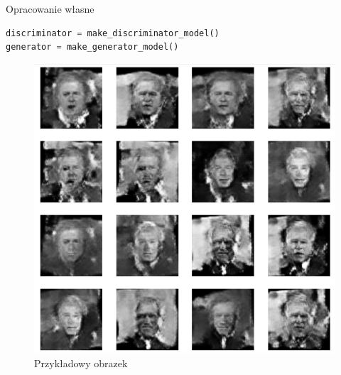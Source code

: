\documentclass[wi]{zut}
\begin{document}
{Opracowanie własne}{\label{kod:przyklad}}
\begin{lstlisting}[language=Python]
discriminator = make_discriminator_model()
generator = make_generator_model()
\end{lstlisting}

\begin{figure}[H]
    \centering
    \includegraphics[width=0.7\linewidth]{images/sample.png}
    \caption{Przykładowy obrazek}
    \label{fig:pdgd}
\end{figure}
\end{document}
